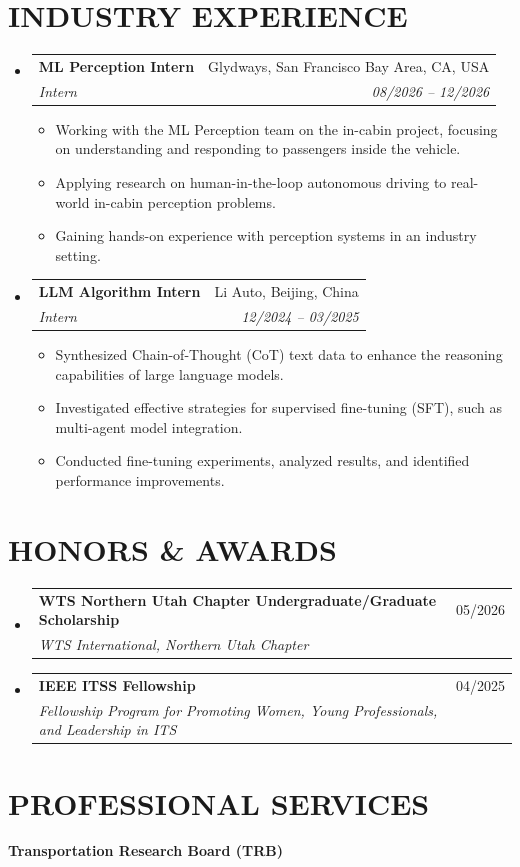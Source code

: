 \documentclass[letterpaper,11pt]{article}
\makeatletter
\newcommand{\resumeItem}[1]{
  \item\small{
    {#1 \vspace{-2pt}}
  }
}
\newcommand{\resumeSubheading}[4]{
  \vspace{-2pt}\item
    \begin{tabular*}{0.97\textwidth}[t]{l@{\extracolsep{\fill}}r}
      \textbf{#1} & #2 \\
      \textit{\small#3} & \textit{\small #4} \\
    \end{tabular*}\vspace{-7pt}
}
\newcommand{\resumeSubHeadingListStart}{\begin{itemize}[leftmargin=0.15in, label={}]}
\newcommand{\resumeSubHeadingListEnd}{\end{itemize}}
\newcommand{\resumeItemListStart}{\begin{itemize}}
\newcommand{\resumeItemListEnd}{\end{itemize}\vspace{-5pt}}
\makeatother
\begin{document}
\section{\textbf{INDUSTRY EXPERIENCE}}
  \resumeSubHeadingListStart
    \resumeSubheading
      {ML Perception Intern}{Glydways, San Francisco Bay Area, CA, USA}
      {Intern}{08/2026 -- 12/2026}
      \resumeItemListStart
      \resumeItem{Working with the ML Perception team on the in-cabin project, focusing on understanding and responding to passengers inside the vehicle.}
      \resumeItem{Applying research on human-in-the-loop autonomous driving to real-world in-cabin perception problems.}
      \resumeItem{Gaining hands-on experience with perception systems in an industry setting.}
      \resumeItemListEnd
    \resumeSubheading
      {LLM Algorithm Intern}{Li Auto, Beijing, China}
      {Intern}{12/2024 -- 03/2025}
      \resumeItemListStart
      \resumeItem{Synthesized Chain-of-Thought (CoT) text data to enhance the reasoning capabilities of large language models.}
      \resumeItem{Investigated effective strategies for supervised fine-tuning (SFT), such as multi-agent model integration.}
      \resumeItem{Conducted fine-tuning experiments, analyzed results, and identified performance improvements.}
      \resumeItemListEnd
  \resumeSubHeadingListEnd
\vspace{10pt}

\section{\textbf{HONORS \& AWARDS}}
  \resumeSubHeadingListStart
    \resumeSubheading
      {WTS Northern Utah Chapter Undergraduate/Graduate Scholarship}{05/2026}
      {WTS International, Northern Utah Chapter}{}
    \vspace{4pt}

    \resumeSubheading
      {IEEE ITSS Fellowship}{04/2025}
      {Fellowship Program for Promoting Women, Young Professionals, and Leadership in ITS}{}
  \resumeSubHeadingListEnd
\vspace{10pt}


\section{\textbf{PROFESSIONAL SERVICES}}

\textbf{Transportation Research Board (TRB)}
\end{document}
